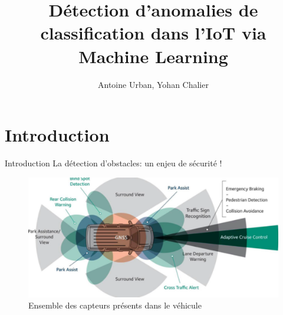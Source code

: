 \documentclass{beamer}
\title{Détection d'anomalies de classification dans l'IoT via Machine Learning}
\author{Antoine Urban, Yohan Chalier}
\institute{Projet de filière SR2I \\ Télécom ParisTech}
\begin{document}
\begin{frame}
\titlepage
\end{frame}

\section{Introduction}

\begin{frame}{Introduction}
La détection d'obstacles: un enjeu de sécurité !
\begin{figure}
\centering
\includegraphics[width=.8\textwidth]{img/sensors.png}
\caption{Ensemble des capteurs présents dans le véhicule}
\end{figure}
\end{frame}
\end{document}

